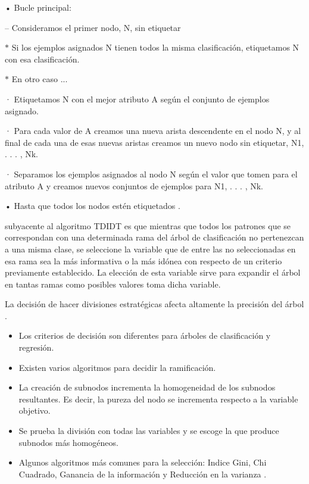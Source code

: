 \documentclass[10pt]{article}
\begin{document}
\setlength{\parskip}{2mm}

• Bucle principal:

\setlength{\parskip}{2mm}

– Consideramos el primer nodo, N, sin etiquetar
\setlength{\parskip}{2mm}

$\ast$ Si los ejemplos asignados N tienen todos la misma clasificación,  etiquetamos N con esa clasificación.

\setlength{\parskip}{2mm}

$\ast$ En otro caso ...

\setlength{\parskip}{2mm}

· Etiquetamos N con el mejor atributo A según el conjunto de
ejemplos asignado.
\setlength{\parskip}{2mm}

· Para cada valor de A creamos una nueva arista descendente en el nodo N, y al final de cada una de esas nuevas aristas creamos un nuevo nodo sin etiquetar, N1, . . . , Nk.

\setlength{\parskip}{2mm}

· Separamos los ejemplos asignados al nodo N según el valor que tomen para el atributo A y creamos nuevos conjuntos de ejemplos para N1, . . . , Nk.


\setlength{\parskip}{2mm}

• Hasta que todos los nodos estén etiquetados \cite{IEEEreferencias:Ref15}.

subyacente al algoritmo TDIDT es que mientras que todos los patrones que se correspondan con una determinada rama del árbol de clasificación no pertenezcan a una misma clase, se seleccione la variable que de entre las no seleccionadas en esa rama sea la más informativa o la más idónea con respecto de un criterio previamente establecido. La elección de esta variable sirve para expandir el árbol en tantas ramas como posibles valores toma dicha variable\cite{IEEEreferencias:Ref15}.

La decisión de hacer divisiones estratégicas afecta altamente la precisión del árbol \cite{IEEEreferencias:Ref44}.

\begin{itemize}
    \item Los criterios de decisión son diferentes para árboles de clasificación y regresión.
    \item Existen varios algoritmos para decidir la ramificación.
    \item La creación de subnodos incrementa la homogeneidad de los subnodos resultantes. Es decir, la pureza del nodo se incrementa respecto a la variable objetivo.
    \item  Se prueba la división con todas las variables y se escoge la que produce subnodos más homogéneos.
    \item Algunos algoritmos más comunes para la selección: Indice Gini, Chi Cuadrado, Ganancia de la información y Reducción en la varianza \cite{IEEEreferencias:Ref44}.

\end{itemize}
\newpage
\end{document}
